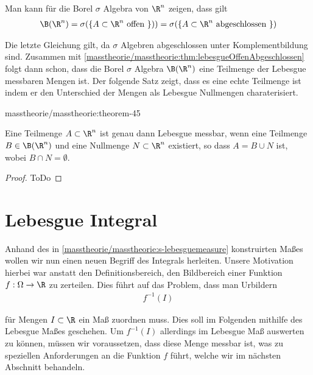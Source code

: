 \documentclass[letterpaper,10pt,german]{jupyterBook}
\begin{document}
\par
Man kann für die Borel \(\sigma\) Algebra von \(\R^n\) zeigen, dass gilt
\begin{align*}
\B(\R^n) = \sigma(\lbrace A \subset \R^n \text{ offen }\rbrace) ) = \sigma(\lbrace A \subset \R^n \text{ abgeschlossen }\rbrace)
\end{align*}
\par
Die letzte Gleichung gilt, da \(\sigma\) Algebren abgeschlossen unter Komplementbildung sind.
Zusammen mit \cref{masstheorie/masstheorie:thm:lebesgueOffenAbgeschlossen} folgt dann schon, dass die Borel \(\sigma\) Algebra \(\B(\R^n)\) eine Teilmenge der Lebesgue messbaren Mengen ist.
Der folgende Satz zeigt, dass es eine echte Teilmenge ist indem er den Unterschied der Mengen als Lebesgue Nullmengen charaterisiert.
\begin{theorem}{}{masstheorie/masstheorie:theorem-45}



\par
Eine Teilmenge \(A \subset \R^n\) ist genau dann Lebesgue messbar, wenn eine Teilmenge \(B \in \B(\R^n)\) und eine Nullmenge \(N \subset \R^n\) existiert, so dass \(A = B \cup N\) ist, wobei \(B\cap N=\emptyset\).
\end{theorem}

\begin{proof}
 ToDo
\end{proof}


\section{Lebesgue Integral}
\label{\detokenize{masstheorie/lebesgue_integral:lebesgue-integral}}\label{\detokenize{masstheorie/lebesgue_integral::doc}}
\par
Anhand des in \cref{masstheorie/masstheorie:s-lebesguemeasure}  konstruirten Maßes wollen wir nun einen neuen Begriff des Integrals herleiten. Unsere Motivation hierbei war anstatt den Definitionsbereich, den Bildbereich einer Funktion \(f:\Omega\to\R\) zu zerteilen. Dies führt auf das Problem, dass man Urbildern
\begin{align*}
f^{-1}(I)
\end{align*}
\par
für Mengen \(I\subset\R\) ein Maß zuordnen muss. Dies soll im Folgenden mithilfe des Lebesgue Maßes geschehen. Um \(f^{-1}(I)\) allerdings im Lebesgue Maß auswerten zu können, müssen wir voraussetzen, dass diese Menge messbar ist, was zu speziellen Anforderungen an die Funktion \(f\) führt, welche wir im nächsten Abschnitt behandeln.
\end{document}
